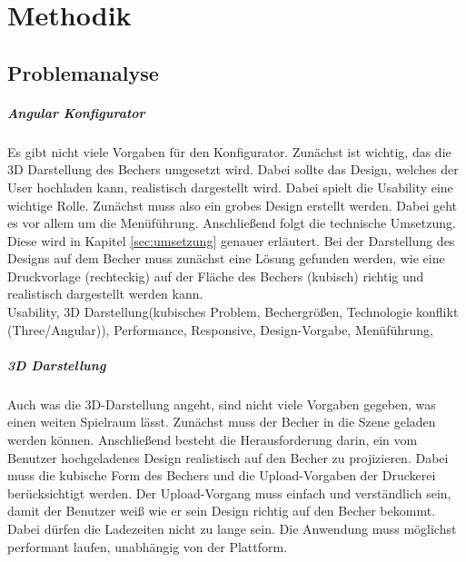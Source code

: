%
%
%
\chapter{Methodik}
\label{cha:methodik}
%
%
%
%
%
%
%
%
%
\section{Problemanalyse}
\label{sec:problemanalyse}
%
\paragraph{Angular Konfigurator}
Es gibt nicht viele Vorgaben für den Konfigurator. Zunächst ist wichtig, das die 3D Darstellung des Bechers umgesetzt wird. Dabei sollte das Design, welches der User hochladen kann, realistisch dargestellt wird. Dabei spielt die Usability eine wichtige Rolle. Zunächst muss also ein grobes Design erstellt werden. Dabei geht es vor allem um die Menüführung. Anschließend folgt die technische Umsetzung. Diese wird in Kapitel \ref{sec:umsetzung} genauer erläutert. Bei der Darstellung des Designs auf dem Becher muss zunächst eine Lösung gefunden werden, wie eine Druckvorlage (rechteckig) auf der Fläche des Bechers (kubisch) richtig und realistisch dargestellt werden kann.\\
Usability, 3D Darstellung(kubisches Problem, Bechergrößen, Technologie konflikt (Three/Angular)), Performance, Responsive, Design-Vorgabe, Menüführung,
\paragraph{3D Darstellung}
Auch was die 3D-Darstellung angeht, sind nicht viele Vorgaben gegeben, was einen weiten Spielraum lässt. Zunächst muss der Becher in die Szene geladen werden können. Anschließend besteht die Herausforderung darin, ein vom Benutzer hochgeladenes Design realistisch auf den Becher zu projizieren. Dabei muss die kubische Form des Bechers und die Upload-Vorgaben der Druckerei berücksichtigt werden. Der Upload-Vorgang muss einfach und verständlich sein, damit der Benutzer weiß wie er sein Design richtig auf den Becher bekommt. Dabei dürfen die Ladezeiten nicht zu lange sein. Die Anwendung muss möglichst performant laufen, unabhängig von der Plattform.

